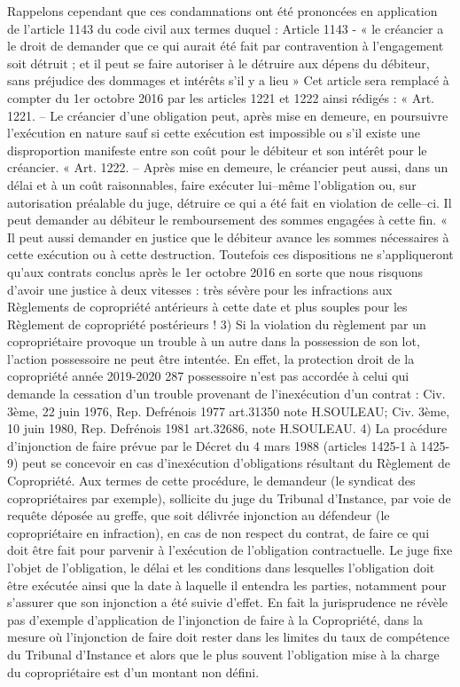 		Rappelons cependant que ces condamnations ont été prononcées en application de l’article 1143 du code civil aux termes duquel : Article 1143 - « le créancier a le droit de demander que ce qui aurait été fait par contravention à l'engagement soit détruit ; et il peut se faire autoriser à le détruire aux dépens du débiteur, sans préjudice des dommages et intérêts s'il y a lieu »
		Cet article sera remplacé à compter du 1er octobre 2016 par les articles 1221 et 1222 ainsi rédigés :
		« Art. 1221. – Le créancier d’une obligation peut, après mise en demeure, en poursuivre l’exécution en nature sauf si cette exécution est impossible ou s’il existe une disproportion manifeste entre son coût pour le débiteur et son intérêt pour le créancier.
		« Art. 1222. – Après mise en demeure, le créancier peut aussi, dans un délai et à un coût raisonnables, faire exécuter lui–même l’obligation ou, sur autorisation préalable du juge, détruire ce qui a été fait en violation de celle–ci. Il peut demander au débiteur le remboursement des sommes engagées à cette fin.
		« Il peut aussi demander en justice que le débiteur avance les sommes nécessaires à cette exécution ou à cette destruction.
		Toutefois ces dispositions ne s’appliqueront qu’aux contrats conclus après le 1er octobre 2016 en sorte que nous risquons d’avoir une justice à deux vitesses : très sévère pour les infractions aux Règlements de copropriété antérieurs à cette date et plus souples pour les Règlement de copropriété postérieurs !
		3) Si la violation du règlement par un copropriétaire provoque un trouble à un autre dans la possession de son lot, l'action possessoire ne peut être intentée. En effet, la protection
		droit de la copropriété année 2019-2020
		287
		possessoire n'est pas accordée à celui qui demande la cessation d'un trouble provenant de l'inexécution d'un contrat : Civ. 3ème, 22 juin 1976, Rep. Defrénois 1977 art.31350 note H.SOULEAU; Civ. 3ème, 10 juin 1980, Rep. Defrénois 1981 art.32686, note H.SOULEAU.
		4) La procédure d’injonction de faire prévue par le Décret du 4 mars 1988 (articles 1425-1 à 1425-9) peut se concevoir en cas d'inexécution d'obligations résultant du Règlement de Copropriété. Aux termes de cette procédure, le demandeur (le syndicat des copropriétaires par exemple), sollicite du juge du Tribunal d'Instance, par voie de requête déposée au greffe, que soit délivrée injonction au défendeur (le copropriétaire en infraction), en cas de non respect du contrat, de faire ce qui doit être fait pour parvenir à l'exécution de l'obligation contractuelle. Le juge fixe l'objet de l'obligation, le délai et les conditions dans lesquelles l'obligation doit être exécutée ainsi que la date à laquelle il entendra les parties, notamment pour s'assurer que son injonction a été suivie d'effet. En fait la jurisprudence ne révèle pas d'exemple d'application de l'injonction de faire à la Copropriété, dans la mesure où l'injonction de faire doit rester dans les limites du taux de compétence du Tribunal d'Instance et alors que le plus souvent l'obligation mise à la charge du copropriétaire est d'un montant non défini.
